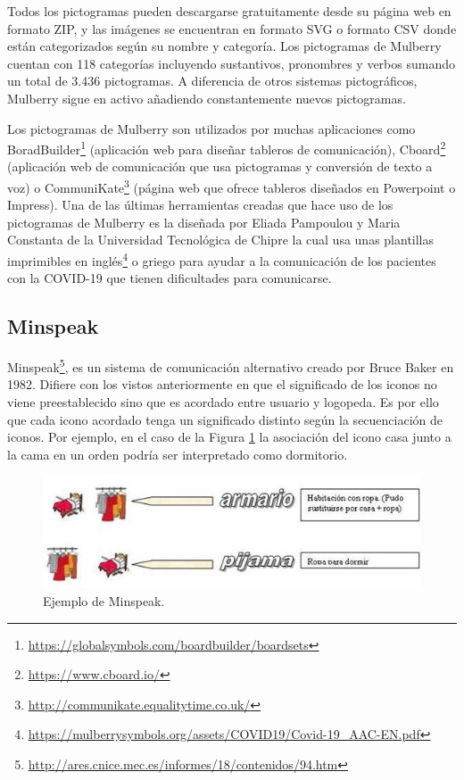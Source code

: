 Todos los pictogramas pueden descargarse gratuitamente desde su página web en formato ZIP, y las imágenes se encuentran en formato SVG o formato CSV donde están categorizados según su nombre y categoría. 
Los pictogramas de Mulberry cuentan con 118 categorías incluyendo sustantivos, pronombres y verbos sumando un total de 3.436 pictogramas. A diferencia de otros sistemas pictográficos, Mulberry sigue en activo añadiendo constantemente nuevos pictogramas. 

Los pictogramas de Mulberry son utilizados por muchas aplicaciones como BoradBuilder\footnote{\url{ https://globalsymbols.com/boardbuilder/boardsets}} (aplicación web para diseñar tableros de comunicación), Cboard\footnote{\url{https://www.cboard.io/}} (aplicación web de comunicación que usa pictogramas y conversión de texto a voz) o CommuniKate\footnote{\url{http://communikate.equalitytime.co.uk/}} (página web que ofrece tableros diseñados en Powerpoint o Impress). Una de las últimas herramientas creadas que hace uso de los pictogramas de Mulberry es la diseñada por Eliada Pampoulou y Maria Constanta de la Universidad Tecnológica de Chipre la cual usa unas plantillas imprimibles en inglés\footnote{\url{https://mulberrysymbols.org/assets/COVID19/Covid-19_AAC-EN.pdf}} o griego para ayudar a la comunicación de los pacientes con la COVID-19 que tienen dificultades para comunicarse.






\subsection{Minspeak}
Minspeak\footnote{\url{http://ares.cnice.mec.es/informes/18/contenidos/94.htm}}, es un sistema de comunicación alternativo creado por Bruce Baker en 1982. Difiere con los vistos anteriormente en que el significado de los iconos no viene preestablecido sino que es acordado entre usuario y logopeda. Es por ello que cada icono acordado tenga un significado distinto según la secuenciación de iconos. Por ejemplo, en el caso de la Figura \ref{fig:minspeak} la asociación del icono casa junto a la cama en un orden podría ser interpretado como dormitorio. 

\begin{figure}[h!]
	\centering
	\includegraphics[width=0.9\linewidth]{Imagenes/Bitmap/Minspeak}
	\caption{Ejemplo de Minspeak.}
	\label{fig:minspeak}
\end{figure}


